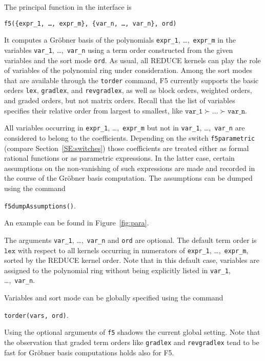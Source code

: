 \documentclass{article}
\newcommand{\grobner}{Gr\"obner}
\newcommand{\code}[1]{\texttt{#1}}
\begin{document}
The principal function in the interface is
%
\begin{center}
    \code{f5(\{expr\_1, \ldots, expr\_m\}, \{var\_n, \ldots, var\_n\}, ord)}
\end{center}
%
It computes a \grobner{} basis of the polynomials \code {expr\_1}, \dots,~\code{expr\_m} in the variables \code{var\_1}, \dots,~\code{var\_n} using a
term order constructed from the given variables and the sort mode \code{ord}. As usual, all REDUCE
kernels can play the role of variables of the polynomial ring under consideration. Among the sort
modes that are available through the
\code{torder} command, F5 currently supports the basic orders \code{lex},
\code{gradlex}, and \code{revgradlex}, as well as block orders,
weighted orders, and graded orders, but not matrix orders. Recall that the list of variables
specifies their relative order from largest to smallest, like $\code{var\_1} \succ \dots \succ
\code{var\_n}$.

All variables occurring in \code{expr\_1}, \dots,~\code{expr\_m} but not in \code{var\_1},
\dots,~\code{var\_n} are considered to belong to the coefficients. Depending on the switch
\code{f5para\-met\-ric} (compare Section~\ref{SE:switches}) those coefficients are treated either as
formal rational functions or as parametric expressions. In the latter case, certain assumptions on
the non-vanishing of such expressions are made and recorded in the course of the \grobner{} basis
computation. The assumptions can be dumped using the command
%
\begin{center}
\code{f5dumpAssumptions()}.
\end{center}
An example can be found in Figure~\ref{fig:para}.

The arguments \code{var\_1}, \dots,~\code{var\_n} and \code{ord} are optional. The default term
order is $\code{lex}$ with respect to all kernels occurring in numerators of \code{expr\_1},
\dots,~\code{expr\_m}, sorted by the REDUCE kernel order. Note that in this default case, variables
are assigned to the polynomial ring without being explicitly listed in \code{var\_1},
\dots,~\code{var\_n}.

Variables and sort mode can be globally specified using the command
%
\begin{center}
    \code{torder(vars, ord)}.
\end{center}
%
Using the optional arguments of \code{f5} shadows the current global
setting. Note that the observation that graded term orders like
\code{gradlex} and \code{revgradlex} tend to be fast for \grobner{}
basis computations \cite[\S5]{tolstaya} holds also for F5.
\end{document}
